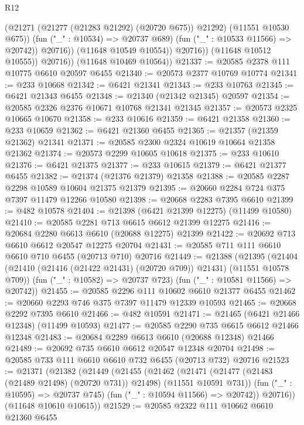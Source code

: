 \begin{lexlean}{R12}
\begin{coremodule}
{{{{{{{{{{{{{{{{{{{{{{{{{{{{{{{{{{{{{{{{{{{{{{{{{{{{{{{{{{{{{{{{{{{{{{{{{{{{{{{{{{                          (@21271 (@21277 (@21283 @21292) (@20720 @675)) @21292)
                          (@11551 @10530 @675))
                        (fun ("_" : @10534) => @20737 @689)
                        (fun ("_" : @10533 @11566) => @20742))
                      @20716))
                  (@11648 @10549 @10554))
                @20716))
            (@11648 @10512 @10555))
          @20716))
      (@11648 @10469 @10564))
@21337 := @20585 @2378 @111 @10775 @6610 @20597 @6455
@21340 := @20573 @2377 @10769 @10774
@21341 := @233 @10668
@21342 := @6421 @21341
@21343 := @233 @10763
@21345 := @6421 @21343 @6455
@21348 := @21340 (@21342 @21345) @20597
@21354 := @20585 @2326 @2376 @10671 @10768 @21341 @21345
@21357 := @20573 @2325 @10665 @10670
@21358 := @233 @10616
@21359 := @6421 @21358
@21360 := @233 @10659
@21362 := @6421 @21360 @6455
@21365 := @21357 (@21359 @21362) @21341
@21371 := @20585 @2300 @2324 @10619 @10664 @21358 @21362
@21374 := @20573 @2299 @10605 @10618
@21375 := @233 @10610
@21376 := @6421 @21375
@21377 := @233 @10615
@21379 := @6421 @21377 @6455
@21382 := @21374 (@21376 @21379) @21358
@21388 := @20585 @2287 @2298 @10589 @10604 @21375 @21379
@21395 := @20660 @2284 @724 @375 @7397 @11479 @12266 @10580
@21398 := @20668 @2283 @7395 @6610
@21399 := @482 @10578
@21404 := @21398 (@6421 @21399 @12275) (@11499 @10580)
@21410 := @20585 @2281 @713 @6615 @6612 @21399 @12275
@21416 := @20684 @2280 @6613 @6610 (@20688 @12275) @21399
@21422 := @20692 @713 @6610 @6612 @20547 @12275 @20704
@21431 := @20585 @711 @111 @6610 @6610 @710 @6455 (@20713 @710) @20716
@21449 := @21388
    (@21395
      (@21404 (@21410 (@21416 (@21422 @21431) (@20720 @709)) @21431) (@11551 @10578 @709))
      (fun ("_" : @10582) => @20737 @723)
      (fun ("_" : @10581 @11566) => @20742))
@21455 := @20585 @2296 @111 @10602 @6610 @21377 @6455
@21462 := @20660 @2293 @746 @375 @7397 @11479 @12339 @10593
@21465 := @20668 @2292 @7395 @6610
@21466 := @482 @10591
@21471 := @21465 (@6421 @21466 @12348) (@11499 @10593)
@21477 := @20585 @2290 @735 @6615 @6612 @21466 @12348
@21483 := @20684 @2289 @6613 @6610 (@20688 @12348) @21466
@21489 := @20692 @735 @6610 @6612 @20547 @12348 @20704
@21498 := @20585 @733 @111 @6610 @6610 @732 @6455 (@20713 @732) @20716
@21523 := @21371
    (@21382
      (@21449
        (@21455
          (@21462
            (@21471 (@21477 (@21483 (@21489 @21498) (@20720 @731)) @21498) (@11551 @10591 @731))
            (fun ("_" : @10595) => @20737 @745)
            (fun ("_" : @10594 @11566) => @20742))
          @20716))
      (@11648 @10610 @10615))
@21529 := @20585 @2322 @111 @10662 @6610 @21360 @6455
}}}}}}}}}}}}}}}}}}}}}}}}}}}}}}}}}}}}}}}}}}}}}}}}}}}}}}}}}}}}}}}}}}}}}}}}}}}}}}}}}}
\end{coremodule}
\end{lexlean}
